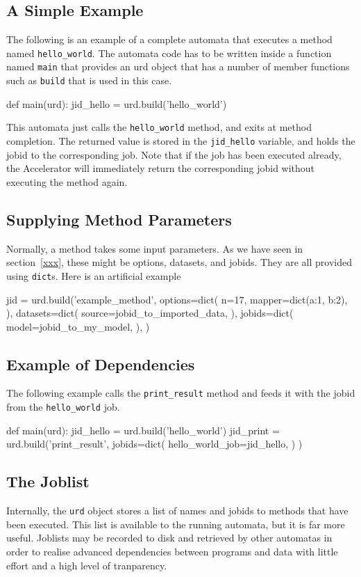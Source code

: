 \documentclass[a4paper]{article}
\begin{document}
\subsection{A Simple Example}
The following is an example of a complete automata that executes a
method named \texttt{hello\_world}.  The automata code has to be
written inside a function named \texttt{main} that provides an urd
object that has a number of member functions such as \texttt{build}
that is used in this case.
\begin{python}
def main(urd):
  jid_hello = urd.build('hello_world')
\end{python}
This automata just calls the \texttt{hello\_world} method, and exits
at method completion.  The returned value is stored in the
\texttt{jid\_hello} variable, and holds the jobid to the corresponding
job.  Note that if the job has been executed already, the Accelerator
will immediately return the corresponding jobid without executing the
method again.

\subsection{Supplying Method Parameters}
Normally, a method takes some input parameters.  As we have seen in
section~\ref{xxx}, these might be options, datasets, and jobids.  They
are all provided using \texttt{dict}s.  Here is an artificial example
\begin{python}
  jid = urd.build('example_method',
    options=dict(
      n=17,
      mapper=dict(a:1, b:2),
    ),
    datasets=dict(
      source=jobid_to_imported_data,
    ),
    jobids=dict(
      model=jobid_to_my_model,
    ),
  )
\end{python}


\clearpage

\subsection{Example of Dependencies}
The following example calls the \texttt{print\_result} method and
feeds it with the jobid from the \texttt{hello\_world} job.
\begin{python}
def main(urd):
  jid_hello = urd.build('hello_world')
  jid_print = urd.build('print_result',
    jobids=dict(
      hello_world_job=jid_hello,
    )
  )
\end{python}

\clearpage



\subsection{The Joblist}
Internally, the \texttt{urd} object stores a list of names and jobids
to methods that have been executed.  This list is available to the
running automata, but it is far more useful.  Joblists may be recorded
to disk and retrieved by other automatas in order to realise advanced
dependencies between programs and data with little effort and a high
level of tranparency.
\end{document}
